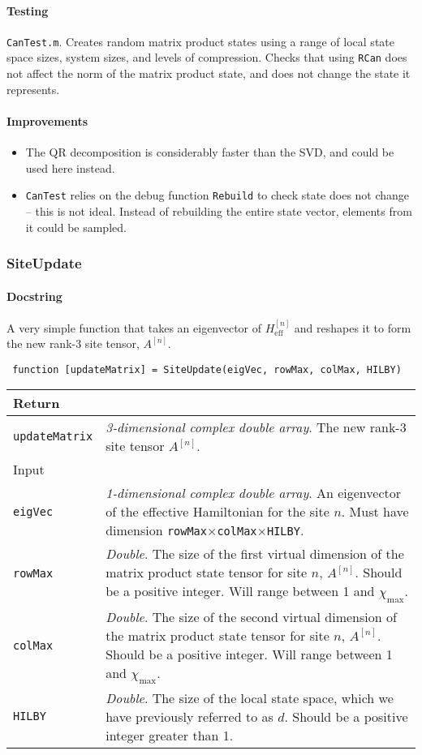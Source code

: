  \paragraph{Testing}
  \lstinline$CanTest.m$. Creates random matrix product states using a range of local state space sizes, system sizes, and levels of compression. Checks that using \lstinline$RCan$ does not affect the norm of the matrix product state, and does not change the state it represents.
  \paragraph{Improvements}
  \begin{itemize}
  \item The QR decomposition is considerably faster than the SVD, and could be used here instead.
  \item \lstinline$CanTest$ relies on the debug function \lstinline$Rebuild$ to check state does not change -- this is not ideal. Instead of rebuilding the entire state vector, elements from it could be sampled.
  \end{itemize}
  
 \subsubsection{SiteUpdate}
 \paragraph{Docstring} A very simple function that takes an eigenvector of \(H^{[n]}_{\mathrm{eff}}\) and reshapes it to form the new rank-3 site tensor, \(A^{[n]}\). 
 \begin{lstlisting}
 function [updateMatrix] = SiteUpdate(eigVec, rowMax, colMax, HILBY) \end{lstlisting}
 \begin{longtabu}{X[1,l]X[4,l]}
 \hline
 Return & \\ \hline
 \lstinline$updateMatrix$ & \emph{3-dimensional complex double array}. The new rank-3 site tensor \(A^{[n]}\). \\ \hline
 Input & \\ \hline
 \lstinline$eigVec$ & \emph{1-dimensional complex double array}. An eigenvector of the effective Hamiltonian for the site \(n\). Must have dimension \lstinline$rowMax$\(\times\)\lstinline$colMax$\(\times\)\lstinline$HILBY$. \\
 \lstinline$rowMax$ & \emph{Double}. The size of the first virtual dimension of the matrix product state tensor for site \(n\), \(A^{[n]}\). Should be a positive integer. Will range between 1 and \(\chi_{\mathrm{max}}\).\\
 \lstinline$colMax$ & \emph{Double}. The size of the second virtual dimension of the matrix product state tensor for site \(n\), \(A^{[n]}\). Should be a positive integer. Will range between 1 and \(\chi_{\mathrm{max}}\).\\
 \lstinline$HILBY$ & \emph{Double}. The size of the local state space, which we have previously referred to as \(d\). Should be a positive integer greater than 1. \\
 \hline
 \end{longtabu}
 
